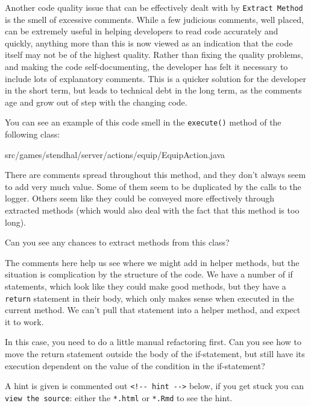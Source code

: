 \documentclass[
]{book}
\newenvironment{Shaded}{\begin{snugshade}}{\end{snugshade}}
\newcommand{\FunctionTok}[1]{\textcolor[rgb]{0.00,0.00,0.00}{#1}}
\newcommand{\NormalTok}[1]{#1}
\begin{document}
Another code quality issue that can be effectively dealt with by \texttt{Extract\ Method} is the smell of excessive comments. While a few judicious comments, well placed, can be extremely useful in helping developers to read code accurately and quickly, anything more than this is now viewed as an indication that the code itself may not be of the highest quality. Rather than fixing the quality problems, and making the code self-documenting, the developer has felt it necessary to include lots of explanatory comments. This is a quicker solution for the developer in the short term, but leads to technical debt in the long term, as the comments age and grow out of step with the changing code.

You can see an example of this code smell in the \texttt{execute()} method of the following class:

\begin{Shaded}
\begin{Highlighting}[]
\NormalTok{src/games/stendhal/server/actions/equip/EquipAction.}\FunctionTok{java}
\end{Highlighting}
\end{Shaded}

There are comments spread throughout this method, and they don't always seem to add very much value. Some of them seem to be duplicated by the calls to the logger. Others seem like they could be conveyed more effectively through extracted methods (which would also deal with the fact that this method is too long).

Can you see any chances to extract methods from this class?

The comments here help us see where we might add in helper methods, but the situation is complication by the structure of the code. We have a number of if statements, which look like they could make good methods, but they have a \texttt{return} statement in their body, which only makes sense when executed in the current method. We can't pull that statement into a helper method, and expect it to work.

In this case, you need to do a little manual refactoring first. Can you see how to move the return statement outside the body of the if-statement, but still have its execution dependent on the value of the condition in the if-statement?

A hint is given is commented out \texttt{\textless{}!-\/-\ hint\ -\/-\textgreater{}} below, if you get stuck you can \texttt{view\ the\ source}: either the \texttt{*.html} or \texttt{*.Rmd} to see the hint.
\end{document}
